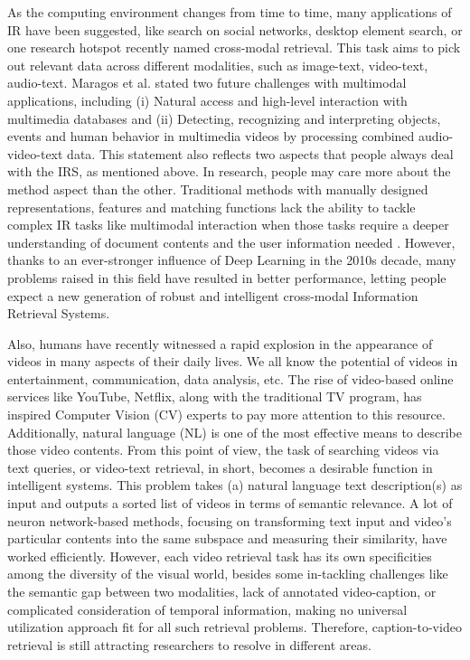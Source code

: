 As the computing environment changes from time to time, many applications of IR have been suggested, like search on social networks, desktop element search, or one research hotspot recently named cross-modal retrieval.
This task aims to pick out relevant data across different modalities, such as image-text, video-text, audio-text.
Maragos et al. \cite{maragos2008multimodal} stated two future challenges with multimodal applications, including (i) Natural access and high-level interaction with multimedia databases and (ii) Detecting, recognizing and interpreting objects, events and human behavior in multimedia videos by processing combined audio-video-text data.
This statement also reflects two aspects that people always deal with the IRS, as mentioned above.
In research, people may care more about the method aspect than the other.
Traditional methods with manually designed representations, features and matching functions lack the ability to tackle complex IR tasks like multimodal interaction when those tasks require a deeper understanding of document contents and the user information needed \cite{culpepper2018research}.
However, thanks to an ever-stronger influence of Deep Learning \cite{goodfellow2016deep,lecun2015deep} in the 2010s decade, many problems raised in this field have resulted in better performance, letting people expect a new generation of robust and intelligent cross-modal Information Retrieval Systems.

Also, humans have recently witnessed a rapid explosion in the appearance of videos in many aspects of their daily lives.
We all know the potential of videos in entertainment, communication, data analysis, etc.
The rise of video-based online services like YouTube, Netflix, along with the traditional TV program, has inspired Computer Vision (CV) experts to pay more attention to this resource. Additionally, natural language (NL) is one of the most effective means to describe those video contents.
From this point of view, the task of searching videos via text queries, or video-text retrieval, in short, becomes a desirable function in intelligent systems.
This problem takes (a) natural language text description(s) as input and outputs a sorted list of videos in terms of semantic relevance.
A lot of neuron network-based methods, focusing on transforming text input and video’s particular contents into the same subspace and measuring their similarity, have worked efficiently.
However, each video retrieval task has its own specificities among the diversity of the visual world, besides some in-tackling challenges like the semantic gap between two modalities, lack of annotated video-caption, or complicated consideration of temporal information, making no universal utilization approach fit for all such retrieval problems.
Therefore, caption-to-video retrieval is still attracting researchers to resolve in different areas.

